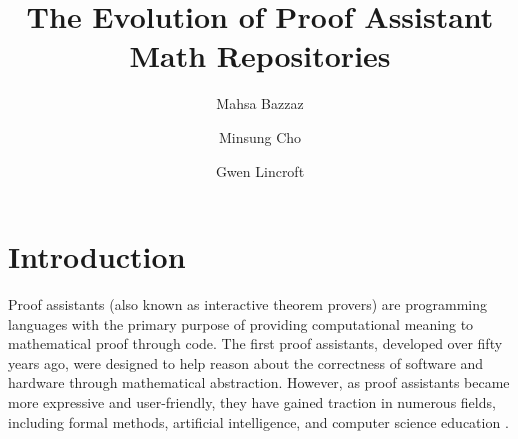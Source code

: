\documentclass[sigconf,nonacm]{acmart}
\begin{document}
\title{The Evolution of Proof Assistant Math Repositories}


\author{Mahsa Bazzaz}

\author{Minsung Cho}

\author{Gwen Lincroft}

\renewcommand{\shortauthors}{Bazzaz, Cho, and Lincroft}

\maketitle

\section{Introduction}

Proof assistants (also known as interactive theorem provers) are programming languages with the primary purpose of providing computational meaning to mathematical proof through code. The first proof assistants, developed over fifty years ago, were designed to help reason about the correctness of software and hardware through mathematical abstraction. However, as proof assistants became more expressive and user-friendly, they have gained traction in numerous fields, including formal methods, artificial intelligence, and computer science education .
\end{document}

